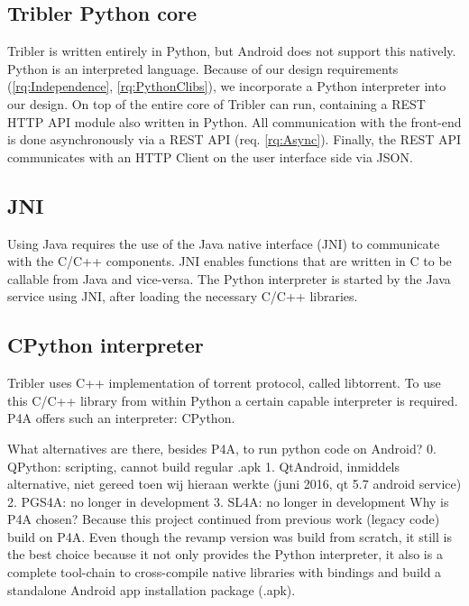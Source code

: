 \subsection{Tribler Python core}
Tribler is written entirely in Python, but Android does not support this natively.
Python is an interpreted language.
Because of our design requirements (\ref{rq:Independence}, \ref{rq:PythonClibs}), we incorporate a Python interpreter into our design.
On top of the entire core of Tribler can run, containing a REST HTTP API module also written in Python.
All communication with the front-end is done asynchronously via a REST API (req. \ref{rq:Async}).
Finally, the REST API communicates with an HTTP Client on the user interface side via JSON.


\subsection{JNI}
Using Java requires the use of the Java native interface (JNI) to communicate with the C/C++ components.
JNI enables functions that are written in C to be callable from Java and vice-versa.
The Python interpreter is started by the Java service using JNI, after loading the necessary C/C++ libraries.


\subsection{CPython interpreter}
Tribler uses C++ implementation of torrent protocol, called libtorrent.
To use this C/C++ library from within Python a certain capable interpreter is required.
P4A offers such an interpreter: CPython.


What alternatives are there, besides P4A, to run python code on Android?
0. QPython: scripting, cannot build regular .apk
1. QtAndroid, inmiddels alternative, niet gereed toen wij hieraan werkte (juni 2016, qt 5.7 android service)
2. PGS4A: no longer in development
3. SL4A: no longer in development
Why is P4A chosen?
Because this project continued from previous work (legacy code) build on P4A.
Even though the revamp version was build from scratch, it still is the best choice because it not only provides the Python interpreter, it also is a complete tool-chain to cross-compile native libraries with bindings and build a standalone Android app installation package (.apk).

